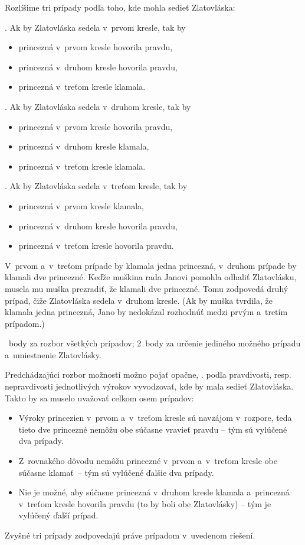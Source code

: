 {%
Rozlíšime tri prípady podľa toho, kde mohla sedieť Zlatovláska:

. Ak by Zlatovláska sedela v~prvom kresle, tak by
\begin{itemize}
\item princezná v~prvom kresle hovorila pravdu,
\item princezná v~druhom kresle hovorila pravdu,
\item princezná v~treťom kresle klamala.
\end{itemize}
. Ak by Zlatovláska sedela v~druhom kresle, tak by
\begin{itemize}
\item princezná v~prvom kresle hovorila pravdu,
\item princezná v~druhom kresle klamala,
\item princezná v~treťom kresle klamala.
\end{itemize}
. Ak by Zlatovláska sedela v~treťom kresle, tak by
\begin{itemize}
\item princezná v~prvom kresle klamala,
\item princezná v~druhom kresle hovorila pravdu,
\item princezná v~treťom kresle hovorila pravdu.
\end{itemize}

V~prvom a~v~treťom prípade by klamala jedna princezná, v~druhom prípade
by klamali dve princezné. Keďže muškina rada Janovi pomohla odhaliť
Zlatovlásku, musela mu muška prezradiť, že klamali dve princezné. Tomu
zodpovedá druhý prípad, čiže Zlatovláska sedela v~druhom kresle.
(Ak by muška tvrdila, že klamala jedna princezná, Jano by nedokázal
rozhodnúť medzi prvým a~tretím prípadom.)

~body za rozbor všetkých prípadov;
2~body za určenie jediného možného prípadu a~umiestnenie Zlatovlásky.
\endhodnotenie

\poznamka
Predchádzajúci rozbor možností možno pojať opačne, \tj. podľa pravdivosti, resp. nepravdivosti jednotlivých výrokov vyvodzovať, kde by mala sedieť Zlatovláska. Takto by sa muselo uvažovať celkom osem prípadov:
\begin{itemize}
\item Výroky princezien v~prvom a~v~treťom kresle sú navzájom v~rozpore, teda tieto dve princezné nemôžu obe súčasne vravieť pravdu -- tým sú vylúčené dva prípady.
\item Z~rovnakého dôvodu nemôžu princezné v~prvom a~v~treťom kresle obe súčasne klamať~-- tým sú vylúčené ďalšie dva prípady.
\item Nie je možné, aby súčasne princezná v~druhom kresle klamala a~princezná v~treťom kresle hovorila pravdu (to by boli obe Zlatovlásky) -- tým je vylúčený ďalší prípad.
\end{itemize}
Zvyšné tri prípady zodpovedajú práve prípadom v~uvedenom riešení.
}

